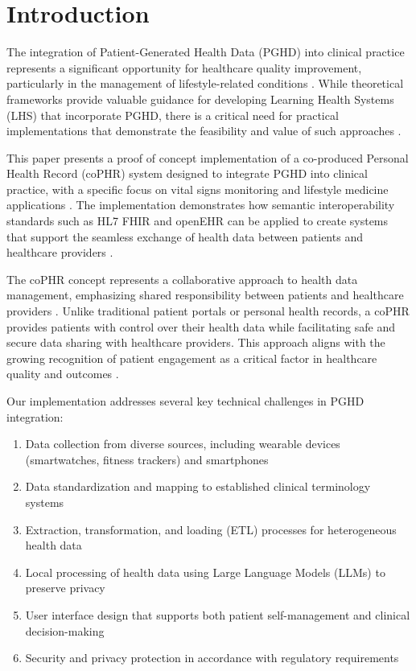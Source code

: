 \section{Introduction}

The integration of Patient-Generated Health Data (PGHD) into clinical practice represents a significant opportunity for healthcare quality improvement, particularly in the management of lifestyle-related conditions \cite{santos2023improving}. While theoretical frameworks provide valuable guidance for developing Learning Health Systems (LHS) that incorporate PGHD, there is a critical need for practical implementations that demonstrate the feasibility and value of such approaches \cite{santos2024improving}.

This paper presents a proof of concept implementation of a co-produced Personal Health Record (coPHR) system designed to integrate PGHD into clinical practice, with a specific focus on vital signs monitoring and lifestyle medicine applications \cite{santos2024healthcare}. The implementation demonstrates how semantic interoperability standards such as HL7 FHIR and openEHR can be applied to create systems that support the seamless exchange of health data between patients and healthcare providers \cite{frade2021openehr}.

The coPHR concept represents a collaborative approach to health data management, emphasizing shared responsibility between patients and healthcare providers \cite{apperta2018blueprint}. Unlike traditional patient portals or personal health records, a coPHR provides patients with control over their health data while facilitating safe and secure data sharing with healthcare providers. This approach aligns with the growing recognition of patient engagement as a critical factor in healthcare quality and outcomes \cite{vaidyam2022enabling}.

Our implementation addresses several key technical challenges in PGHD integration:

\begin{enumerate}
    \item Data collection from diverse sources, including wearable devices (smartwatches, fitness trackers) and smartphones
    \item Data standardization and mapping to established clinical terminology systems
    \item Extraction, transformation, and loading (ETL) processes for heterogeneous health data
    \item Local processing of health data using Large Language Models (LLMs) to preserve privacy \cite{miao2024chain}
    \item User interface design that supports both patient self-management and clinical decision-making
    \item Security and privacy protection in accordance with regulatory requirements \cite{sousa2018openehr}
\end{enumerate}

